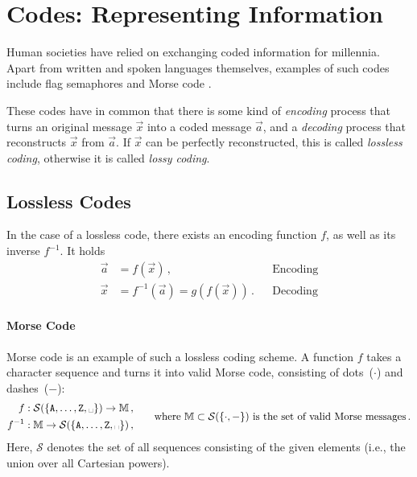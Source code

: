 \documentclass[10pt,letterpaper,oneside]{article}
\begin{document}
\section{Codes: Representing Information}

Human societies have relied on exchanging coded information for millennia. Apart from written and spoken languages themselves, examples of such codes include flag semaphores and Morse code \cite{2009itur}.

These codes have in common that there is some kind of \emph{encoding} process that turns an original message $\vec x$ into a coded message $\vec a$, and a \emph{decoding} process that reconstructs $\vec x$ from $\vec a$. If $\vec x$ can be perfectly reconstructed, this is called \emph{lossless coding}, otherwise it is called \emph{lossy coding}.

\subsection{Lossless Codes}

In the case of a lossless code, there exists an encoding function $f$, as well as its inverse $f^{-1}$. It holds
\begin{align*}
	\vec a &= f(\vec x) \,, && \text{Encoding} \\
	\vec x &= f^{-1}(\vec a) = g(f(\vec x)) \,. && \text{Decoding} 
\end{align*}

\paragraph{Morse Code} Morse code is an example of such a lossless coding scheme. A function $f$ takes a character sequence and turns it into valid Morse code, consisting of dots~($\cdot$) and dashes~($-$):
\begin{align*}
	\begin{aligned}
	f&: \mathcal{S}(\{\mathtt{A}, \ldots, \mathtt{Z}, \text{\textvisiblespace}\}) \rightarrow \mathbb{M} \,, \\
	f^{-1} &: \mathbb{M} \rightarrow \mathcal{S}(\{\mathtt{A}, \ldots, \mathtt{Z}, \text{\textvisiblespace}\}) \,,
	\end{aligned} &&\quad \text{where } \mathbb{M} \subset \mathcal{S}(\{\cdot, -\}) \text{ is the set of valid Morse messages} \,.
\end{align*}
Here, $\mathcal{S}$ denotes the set of all sequences consisting of the given elements (i.e., the union over all Cartesian powers).
\end{document}
